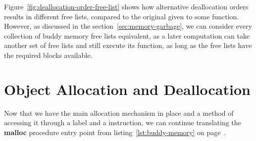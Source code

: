 Figure~\ref{fig:deallocation-order-free-list} shows how alternative deallocation orders results in different free lists, compared to the original given to some function. However, as discussed in the section~\ref{sec:memory-garbage}, we can consider every collection of buddy memory free lists equivalent, as a later computation can take another set of free lists and still execute its function, as long as the free lists have the required blocks available.


\section{Object Allocation and Deallocation}
\label{sec:object-allocation-deallocation}
Now that we have the main allocation mechanism in place and a method of accessing it through a label and a  instruction, we can continue translating the \textbf{malloc} procedure entry point from listing~\ref{lst:buddy-memory} on page~\pageref{lst:buddy-memory}.

